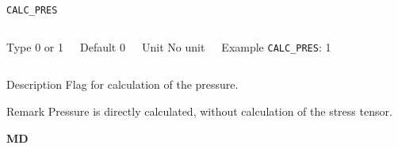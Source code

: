 \documentclass[xcolor=dvipsnames,t]{beamer}
\begin{document}
\begin{frame}[allowframebreaks]{\texttt{CALC\_PRES}} \label{CALC_PRES}
\vspace*{-12pt}
\begin{columns}
\begin{block}{Type}
0 or 1
\end{block}

\begin{block}{Default}
0
\end{block}

\begin{block}{Unit}
No unit
\end{block}

\begin{block}{Example}
\texttt{CALC\_PRES}: 1
\end{block}
\end{columns}

\begin{block}{Description}
Flag for calculation of the pressure.
\end{block}

\begin{block}{Remark}
Pressure is directly calculated, without calculation of the stress tensor.
\end{block}

\end{frame}



\begin{frame}[allowframebreaks,c]{} \label{MD}

\begin{center}
\Huge \textbf{MD}
\end{center}

\end{frame}
\end{document}
